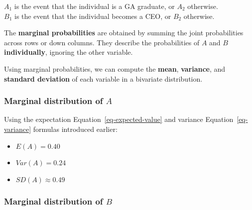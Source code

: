 \documentclass[
  letterpaper,
  DIV=11,
  numbers=noendperiod]{scrreprt}
\providecommand{\tightlist}{%
  \setlength{\itemsep}{0pt}\setlength{\parskip}{0pt}}
\begin{document}
\(A_1\) is the event that the individual is a GA graduate, or \(A_2\)
otherwise.\\
\(B_1\) is the event that the individual becomes a CEO, or \(B_2\)
otherwise.

The \textbf{marginal probabilities} are obtained by summing the joint
probabilities across rows or down columns. They describe the
probabilities of \(A\) and \(B\) \textbf{individually}, ignoring the
other variable.

Using marginal probabilities, we can compute the \textbf{mean},
\textbf{variance}, and \textbf{standard deviation} of each variable in a
bivariate distribution.

\subsubsection{\texorpdfstring{Marginal distribution of
\(A\)}{Marginal distribution of A}}\label{marginal-distribution-of-a}

\begin{table}

\caption{\label{tbl-marginal-A}Marginal Distribution of Event A}


\end{table}%

Using the expectation Equation~\ref{eq-expected-value} and variance
Equation~\ref{eq-variance} formulas introduced earlier:

\begin{itemize}
\tightlist
\item
  \(E(A) = 0.40\)
\item
  \(Var(A) = 0.24\)
\item
  \(SD(A) \approx 0.49\)
\end{itemize}

\subsubsection{\texorpdfstring{Marginal distribution of
\(B\)}{Marginal distribution of B}}\label{marginal-distribution-of-b}
\end{document}
